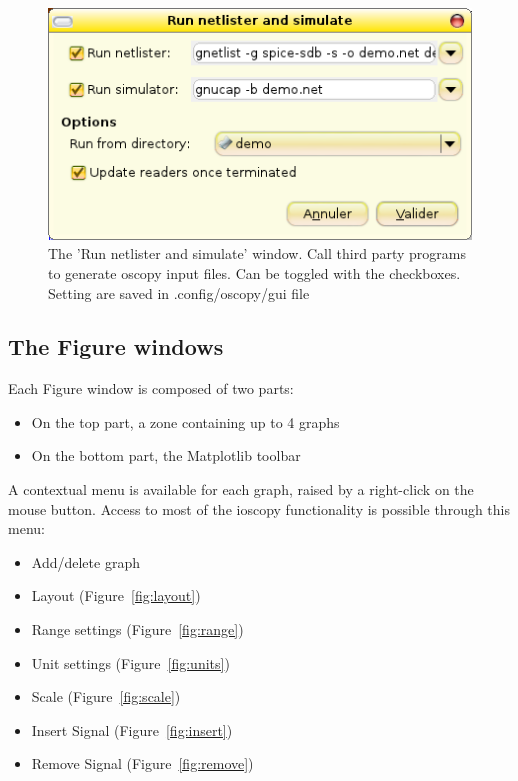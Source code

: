 \documentclass[a4paper,11pt]{article}
\begin{document}
\begin{figure}[htbp]
  \includegraphics[scale=.5]{../png/ioscopy-netnsim.png}
  \caption{The 'Run netlister and simulate' window. Call third party programs to generate oscopy input files. Can be toggled with the checkboxes. Setting are saved in .config/oscopy/gui file}
  \label{fig:netnsim}

\end{figure}



\subsection{The Figure windows}

Each Figure window is composed of two parts:
\begin{itemize}
\item On the top part, a zone containing up to 4 graphs
\item On the bottom part, the Matplotlib toolbar
\end{itemize}
A contextual menu is available for each graph, raised by a right-click on the mouse button.
Access to most of the ioscopy functionality is possible through this menu:
\begin{itemize}
\item Add/delete graph
\item Layout (Figure~\ref{fig:layout})
\item Range settings (Figure~\ref{fig:range})
\item Unit settings (Figure~\ref{fig:units})
\item Scale (Figure~\ref{fig:scale})
\item Insert Signal (Figure~\ref{fig:insert})
\item Remove Signal (Figure~\ref{fig:remove})
\end{itemize}
\end{document}
